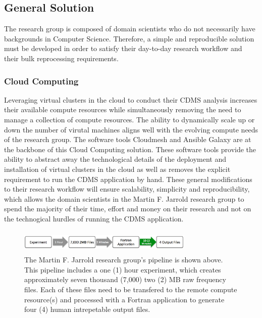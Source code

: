\documentclass[9pt,twocolumn,twoside]{../../styles/osajnl}
\begin{document}
\subsection{General Solution} \label{solution}
The research group is composed of domain scientists who do not
necessarily have backgrounds in Computer Science. Therefore, a simple
and reproducible solution must be developed in order to satisfy their
day-to-day research workflow and their bulk reprocessing requirements.

\subsubsection{Cloud Computing}
Leveraging virtual clusters in the cloud to conduct their CDMS
analysis increases their available compute resources while
simultaneously removing the need to manage a collection of compute
resources. The ability to dynamically scale up or down the number of
virutal machines aligns well with the evolving compute needs of the
research group. The software tools Cloudmesh and Ansible Galaxy are at
the backbone of this Cloud Computing solution. These software tools
provide the ability to abstract away the technological details of the
deployment and installation of virtual clusters in the cloud as well
as removes the explicit requirement to run the CDMS application by
hand. These general modifications to their research workflow will
ensure scalability, simplicity and reproducibility, which allows the
domain scientists in the Martin F. Jarrold research group to spend the
majority of their time, effort and money on their research and not on
the technogical hurdles of running the CDMS application.

\begin{figure}
\centering
\includegraphics[height=0.45in, width=3.3in]{images/pipeline}
\caption{The Martin F. Jarrold research group's pipeline is shown
  above. This pipeline includes a one (1) hour experiment, which
  creates approximately seven thousand (7,000) two (2) MB raw
  frequency files. Each of these files need to be transfered to the
  remote compute resource(s) and processed with a Fortran application
  to generate four (4) human intrepetable output files.}
\label{fig:pipeline}
\end{figure}
\end{document}
